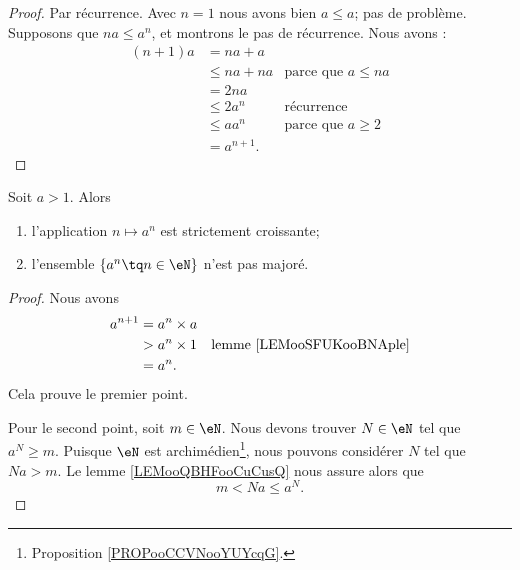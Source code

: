 \begin{proof}
	Par récurrence. Avec \( n=1\) nous avons bien \( a\leq a\); pas de problème. Supposons que \( na\leq a^n\), et montrons le pas de récurrence. Nous avons :
	\begin{subequations}
		\begin{align}
			(n+1)a & =   na+a                                   \\
			       & \leq  na+na  & \text{parce que }  a\leq na \\
			       & =   2na                                    \\
			       & \leq  2a^n   & \text{récurrence}           \\
			       & \leq  aa^n   & \text{parce que } a\geq 2   \\
			       & =   a^{n+1}.
		\end{align}
	\end{subequations}
\end{proof}

\begin{proposition}
	Soit \( a>1\). Alors
	\begin{enumerate}
		\item
		      l'application \( n\mapsto a^n\) est strictement croissante;
		\item
		      l'ensemble \( \{ a^n\tq n\in \eN \}\) n'est pas majoré.
	\end{enumerate}
\end{proposition}

\begin{proof}
	Nous avons
	\begin{subequations}
		\begin{align}
			a^{n+1} & =a^n\times a                                        \\
			        & >a^n\times 1 & \text{lemme \ref{LEMooSFUKooBNAple}} \\
			        & =a^n.
		\end{align}
	\end{subequations}
	Cela prouve le premier point.

	Pour le second point, soit \( m\in \eN\). Nous devons trouver \( N\in \eN\) tel que \( a^N\geq m\). Puisque \( \eN\) est archimédien\footnote{Proposition \ref{PROPooCCVNooYUYcqG}.}, nous pouvons considérer \( N\) tel que \( Na>m\). Le lemme \ref{LEMooQBHFooCuCusQ} nous assure alors que
	\begin{equation}
		m<Na\leq a^N.
	\end{equation}
\end{proof}

